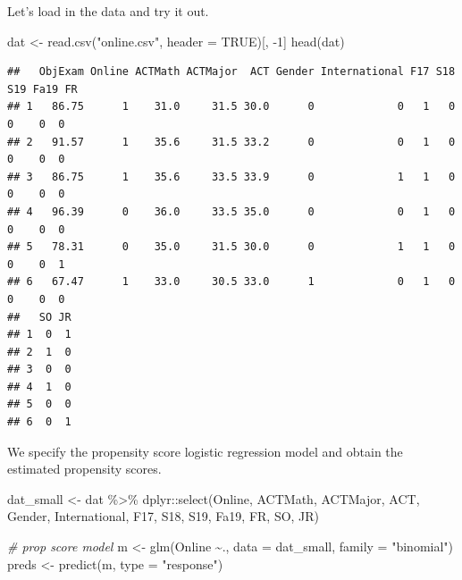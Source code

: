 \documentclass[
  ignorenonframetext,
]{beamer}
\newenvironment{Shaded}{\begin{snugshade}}{\end{snugshade}}
\newcommand{\AttributeTok}[1]{\textcolor[rgb]{0.77,0.63,0.00}{#1}}
\newcommand{\CommentTok}[1]{\textcolor[rgb]{0.56,0.35,0.01}{\textit{#1}}}
\newcommand{\ConstantTok}[1]{\textcolor[rgb]{0.00,0.00,0.00}{#1}}
\newcommand{\DecValTok}[1]{\textcolor[rgb]{0.00,0.00,0.81}{#1}}
\newcommand{\FunctionTok}[1]{\textcolor[rgb]{0.00,0.00,0.00}{#1}}
\newcommand{\NormalTok}[1]{#1}
\newcommand{\OtherTok}[1]{\textcolor[rgb]{0.56,0.35,0.01}{#1}}
\newcommand{\SpecialCharTok}[1]{\textcolor[rgb]{0.00,0.00,0.00}{#1}}
\newcommand{\StringTok}[1]{\textcolor[rgb]{0.31,0.60,0.02}{#1}}
\begin{document}
\begin{frame}[fragile]{}
\protect\hypertarget{section-14}{}
Let's load in the data and try it out.

\vspace{12pt}
\tiny

\begin{Shaded}
\begin{Highlighting}[]
\NormalTok{dat }\OtherTok{\textless{}{-}} \FunctionTok{read.csv}\NormalTok{(}\StringTok{"online.csv"}\NormalTok{, }\AttributeTok{header =} \ConstantTok{TRUE}\NormalTok{)[, }\SpecialCharTok{{-}}\DecValTok{1}\NormalTok{]}
\FunctionTok{head}\NormalTok{(dat)}
\end{Highlighting}
\end{Shaded}

\begin{verbatim}
##   ObjExam Online ACTMath ACTMajor  ACT Gender International F17 S18 S19 Fa19 FR
## 1   86.75      1    31.0     31.5 30.0      0             0   1   0   0    0  0
## 2   91.57      1    35.6     31.5 33.2      0             0   1   0   0    0  0
## 3   86.75      1    35.6     33.5 33.9      0             1   1   0   0    0  0
## 4   96.39      0    36.0     33.5 35.0      0             0   1   0   0    0  0
## 5   78.31      0    35.0     31.5 30.0      0             1   1   0   0    0  1
## 6   67.47      1    33.0     30.5 33.0      1             0   1   0   0    0  0
##   SO JR
## 1  0  1
## 2  1  0
## 3  0  0
## 4  1  0
## 5  0  0
## 6  0  1
\end{verbatim}

\vspace{12pt}
\normalsize

We specify the propensity score logistic regression model and obtain the
estimated propensity scores.

\vspace{12pt}
\tiny

\begin{Shaded}
\begin{Highlighting}[]
\NormalTok{dat\_small }\OtherTok{\textless{}{-}}\NormalTok{ dat }\SpecialCharTok{\%\textgreater{}\%} 
\NormalTok{  dplyr}\SpecialCharTok{::}\FunctionTok{select}\NormalTok{(Online, ACTMath, ACTMajor, ACT, Gender,}
\NormalTok{                International, F17, S18, S19, Fa19, FR, SO, JR)}

\CommentTok{\# prop score model}
\NormalTok{m }\OtherTok{\textless{}{-}} \FunctionTok{glm}\NormalTok{(Online }\SpecialCharTok{\textasciitilde{}}\NormalTok{., }\AttributeTok{data =}\NormalTok{ dat\_small, }\AttributeTok{family =} \StringTok{"binomial"}\NormalTok{)}
\NormalTok{preds }\OtherTok{\textless{}{-}} \FunctionTok{predict}\NormalTok{(m, }\AttributeTok{type =} \StringTok{"response"}\NormalTok{)}
\end{Highlighting}
\end{Shaded}
\end{frame}
\end{document}
